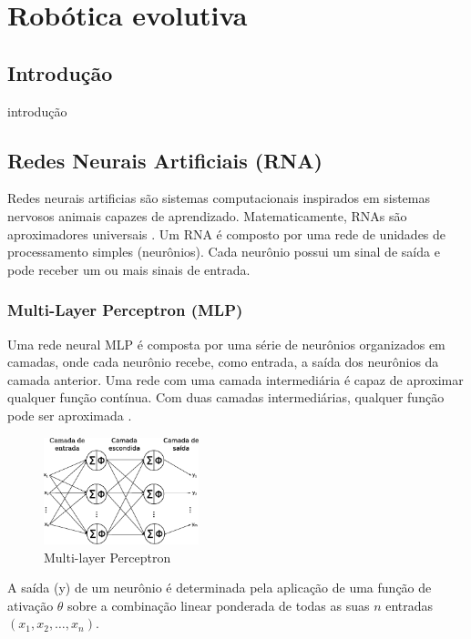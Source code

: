 \chapter{Robótica evolutiva}
\label{evolutiva}

\section{Introdução}

introdução

\section{Redes Neurais Artificiais (RNA)}

Redes neurais artificias são sistemas computacionais inspirados em sistemas
nervosos animais capazes de aprendizado. Matematicamente, RNAs são aproximadores
universais \cite{hornik89universal}. Um RNA é composto por uma rede de unidades
de processamento simples (neurônios). Cada neurônio possui um sinal de saída e
pode receber um ou mais sinais de entrada.

\subsection{Multi-Layer Perceptron (MLP)}

Uma rede neural MLP é composta por uma série de neurônios organizados em camadas, onde cada neurônio recebe, como entrada, a saída dos neurônios da camada anterior. Uma rede com uma camada intermediária é capaz de aproximar qualquer função contínua. Com duas camadas intermediárias, qualquer função pode ser aproximada \cite{cybenko89mlp}.

\begin{figure}[h]
    \centering
    \includegraphics[width=0.4\textwidth]{figures/mlp}
    \caption{Multi-layer Perceptron}
    \label{fig:mlp}
\end{figure}

A saída (y) de um neurônio é determinada pela aplicação de uma função de ativação \(\theta\) sobre a combinação linear ponderada de todas as suas \(n\) entradas \((x_1, x_2, \dots , x_n)\).

